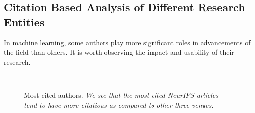 \subsection{Citation Based Analysis of Different Research Entities}
In machine learning, some authors play more significant roles in advancements of the field than others. It is worth observing the impact and usability of their research. 
\begin{figure}[!htbp]
	\begin{center}
	\\
	\end{center}
	\caption{Most-cited authors. \textit{We see that the most-cited NeurIPS articles tend to have more citations as compared to other three venues.}}
	\label{fig:cited_top}
\end{figure}


